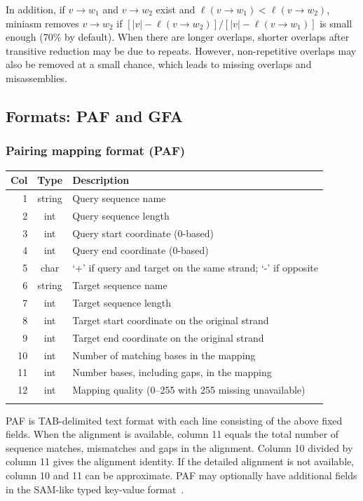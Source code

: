 \documentclass{bioinfo}
\begin{document}
\begin{methods}
In addition, if $v\to w_1$ and $v\to w_2$ exist and $\ell(v\to w_1)<\ell(v\to
w_2)$, miniasm removes $v\to w_2$ if $[|v|-\ell(v\to w_2)]/[|v|-\ell(v\to
w_1)]$ is small enough (70\% by default). When there are longer overlaps,
shorter overlaps after transitive reduction may be due to repeats.
However, non-repetitive overlaps may also be removed at a small chance, which
leads to missing overlaps and misassemblies.

\subsection{Formats: PAF and GFA}

\subsubsection{Pairing mapping format (PAF)}

\begin{table}[tb]
{\footnotesize\label{tab:paf}
\begin{tabular}{rcl}
\toprule
Col & Type & Description \\
\midrule
1 & string & Query sequence name \\
2 & int    & Query sequence length \\
3 & int    & Query start coordinate (0-based) \\
4 & int    & Query end coordinate (0-based) \\
5 & char   & `+' if query and target on the same strand; `-' if opposite \\
6 & string & Target sequence name \\
7 & int    & Target sequence length \\
8 & int    & Target start coordinate on the original strand \\
9 & int    & Target end coordinate on the original strand \\
10& int    & Number of matching bases in the mapping \\
11& int    & Number bases, including gaps, in the mapping \\
12& int    & Mapping quality (0--255 with 255 missing unavailable) \\
\botrule
\end{tabular}
}{PAF is TAB-delimited text format with each line consisting of the above fixed
fields. When the alignment is available, column 11 equals the total number of
sequence matches, mismatches and gaps in the alignment. Column 10 divided by
column 11 gives the alignment identity. If the detailed alignment is not
available, column 10 and 11 can be approximate. PAF may optionally have
additional fields in the SAM-like typed key-value format~\citep{Li:2009ys}.}
\end{table}


\end{methods}
\end{document}
